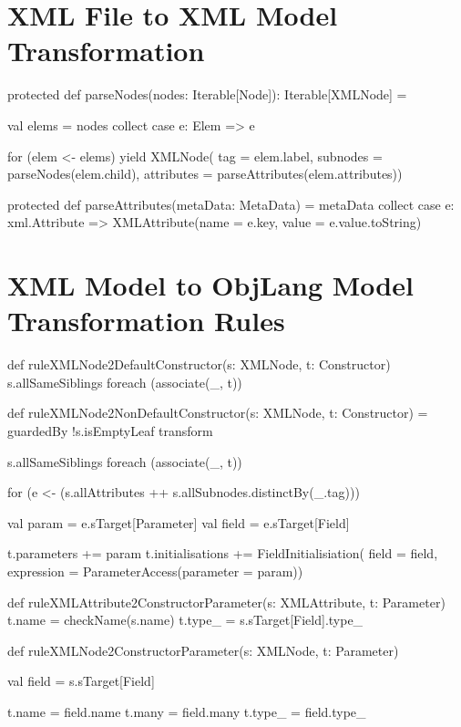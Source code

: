 \section{XML File to XML Model Transformation}
\label{sec:AppendixXMLTransfromation}

\begin{scalacode}
protected def parseNodes(nodes: Iterable[Node]): Iterable[XMLNode] = {
  val elems = nodes collect { case e: Elem => e }

  for (elem <- elems) yield XMLNode(
    tag = elem.label,
    subnodes = parseNodes(elem.child),
    attributes = parseAttributes(elem.attributes))
}

protected def parseAttributes(metaData: MetaData) =
  metaData collect {
    case e: xml.Attribute => XMLAttribute(name = e.key, value = e.value.toString)
  }
\end{scalacode}


\section{XML Model to ObjLang Model Transformation Rules}
\label{sec:AppendixTransformationRules}

\begin{scalacode}
def ruleXMLNode2DefaultConstructor(s: XMLNode, t: Constructor) {
  s.allSameSiblings foreach (associate(_, t))
}
\end{scalacode}

\begin{scalacode}
def ruleXMLNode2NonDefaultConstructor(s: XMLNode, t: Constructor) = guardedBy {
  !s.isEmptyLeaf
} transform {

  s.allSameSiblings foreach (associate(_, t))

  for (e <- (s.allAttributes ++ s.allSubnodes.distinctBy(_.tag))) {
    val param = e.sTarget[Parameter]
    val field = e.sTarget[Field]

    t.parameters += param
    t.initialisations += FieldInitialisiation(
      field = field,
      expression = ParameterAccess(parameter = param))
  }
}
\end{scalacode}

\begin{scalacode}
def ruleXMLAttribute2ConstructorParameter(s: XMLAttribute, t: Parameter) {
  t.name = checkName(s.name)
  t.type_ = s.sTarget[Field].type_
}
\end{scalacode}

\begin{scalacode}
def ruleXMLNode2ConstructorParameter(s: XMLNode, t: Parameter) {
  val field = s.sTarget[Field]

  t.name = field.name
  t.many = field.many
  t.type_ = field.type_
}
\end{scalacode}

